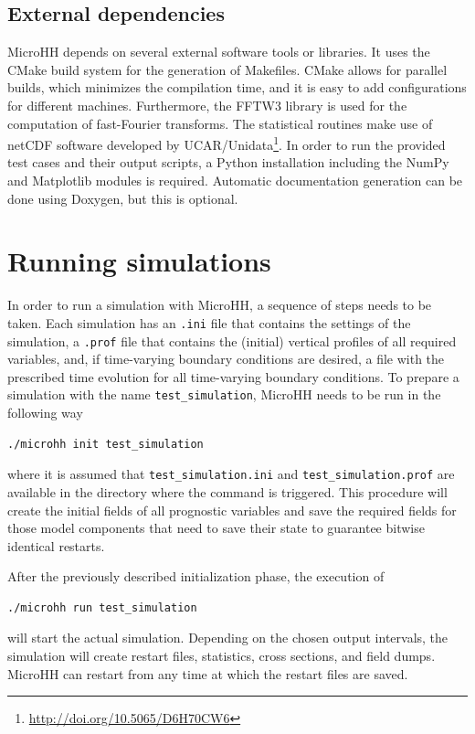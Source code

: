 \documentclass[gmd,manuscript]{copernicus}
\begin{document}
\subsection{External dependencies}
MicroHH depends on several external software tools or libraries. It uses the CMake build system for the generation of Makefiles. CMake allows for parallel builds, which minimizes the compilation time, and it is easy to add configurations for different machines. Furthermore, the FFTW3 library \citep{Frigo2005} is used for the computation of fast-Fourier transforms. The statistical routines make use of netCDF software developed by UCAR/Unidata\footnote{\url{http://doi.org/10.5065/D6H70CW6}}. In order to run the provided test cases and their output scripts, a Python installation including the NumPy and Matplotlib modules is required. Automatic documentation generation can be done using Doxygen, but this is optional.

\section{Running simulations}
\label{sec:running_simulations}
In order to run a simulation with MicroHH, a sequence of steps needs to be taken. Each simulation has an \texttt{.ini} file that contains the settings of the simulation, a \texttt{.prof} file that contains the (initial) vertical profiles of all required variables, and, if time-varying boundary conditions are desired, a file with the prescribed time evolution for all time-varying boundary conditions. To prepare a simulation with the name \texttt{test\_simulation}, MicroHH needs to be run in the following way
\begin{verbatim}
./microhh init test_simulation
\end{verbatim}
where it is assumed that \texttt{test\_simulation.ini} and \texttt{test\_simulation.prof} are available in the directory where the command is triggered. This procedure will create the initial fields of all prognostic variables and save the required fields for those model components that need to save their state to guarantee bitwise identical restarts. 

After the previously described initialization phase, the execution of
\begin{verbatim}
./microhh run test_simulation
\end{verbatim}
will start the actual simulation. Depending on the chosen output intervals, the simulation will create restart files, statistics, cross sections, and field dumps. MicroHH can restart from any time at which the restart files are saved.
\end{document}
